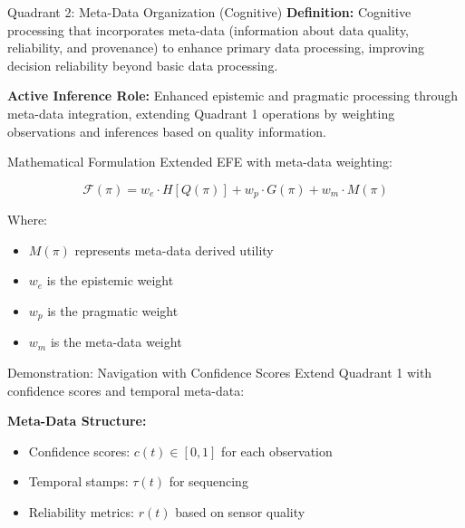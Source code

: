 \documentclass[
  ignorenonframetext,
]{beamer}
\providecommand{\tightlist}{%
  \setlength{\itemsep}{0pt}\setlength{\parskip}{0pt}}
\begin{document}
\begin{frame}
\begin{block}{Quadrant 2: Meta-Data Organization (Cognitive)}
\protect{}\label{sec:quadrant_2}
\textbf{Definition:} Cognitive processing that incorporates meta-data
(information about data quality, reliability, and provenance) to enhance
primary data processing, improving decision reliability beyond basic
data processing.

\textbf{Active Inference Role:} Enhanced epistemic and pragmatic
processing through meta-data integration, extending Quadrant 1
operations by weighting observations and inferences based on quality
information.

\begin{block}{Mathematical Formulation}
\protect{}\label{mathematical-formulation-1}
Extended EFE with meta-data weighting:

\begin{equation}
\mathcal{F}(\pi) = w_e \cdot H[Q(\pi)] + w_p \cdot G(\pi) + w_m \cdot M(\pi)
\label{eq:efe_metadata}
\end{equation}

Where:

\begin{itemize}
\tightlist
\item
  \(M(\pi)\) represents meta-data derived utility
\item
  \(w_e\) is the epistemic weight
\item
  \(w_p\) is the pragmatic weight
\item
  \(w_m\) is the meta-data weight
\end{itemize}
\end{block}

\begin{block}{Demonstration: Navigation with Confidence Scores}
\protect{}\label{demonstration-navigation-with-confidence-scores}
Extend Quadrant 1 with confidence scores and temporal meta-data:

\textbf{Meta-Data Structure:}

\begin{itemize}
\tightlist
\item
  Confidence scores: \(c(t) \in [0,1]\) for each observation
\item
  Temporal stamps: \(\tau(t)\) for sequencing
\item
  Reliability metrics: \(r(t)\) based on sensor quality
\end{itemize}


\end{block}
\end{block}
\end{frame}
\end{document}
